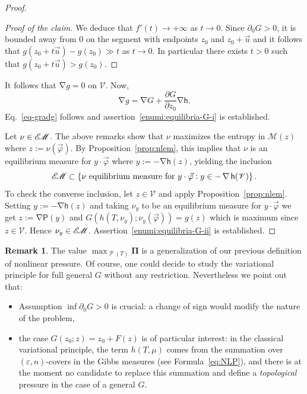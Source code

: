 \documentclass[10pt]{amsart}
\theoremstyle{definition}\newtheorem{defi}[theo]{Definition}\newtheorem{rema}[theo]{Remark}\newtheorem{exam}[theo]{Example}\newtheorem{exem}[theo]{Example}\newtheorem{nota}[theo]{Notation}
\theoremstyle{plain}
\theoremstyle{plain}
\newcommand\eps{\varepsilon}
\newcommand\FNLP{\boldsymbol{\Pi}}
\newcommand\vpot{\vec\pot}
\newcommand\Prob{{\operatorname{\mathscr{P}}}}
\newcommand{\grad}{\operatorname{\nabla}}
\newcommand{\hf}{\mathsf{h}}
\newcommand{\Pf}{\mathsf{P}}
\newcommand{\EM}{\mathscr{E\kern-2pt M}}
\newcommand{\pot}{\varphi}
\newcounter{In}
\newcommand*\8{\infty}
\newcommand{\cM}{\mathcal{M}}
\newcommand{\scV}{\mathscr{V}}
\begin{document}
\begin{proof}
\begin{proof}[Proof of the claim]
We deduce that $f'(t)\to+\infty$ as $t\to0$. Since $\partial_0G>0$, it is bounded away from $0$ on the segment with endpoints $z_0$ and $z_0+\vec u$ and it follows that $g(z_0+t \vec u)-g(z_0)\gg t$ as $t\to0$. In particular there exists $t>0$ such that $g(z_0+t \vec u)>g(z_0)$.
\end{proof}


It follows that $\grad g = 0$ on $\scV$. Now,
\begin{equation}\label{eq-grad-g}
\grad g = \grad G + \frac{\partial G}{\partial z_0} \grad \hf.
\end{equation}
Eq.~\eqref{eq-gradg} follows and assertion~\eqref{enumi:equilibria-G-i} is established.

Let $\nu\in\EM$. The above remarks show that $\nu$ maximizes the entropy in $\cM(z)$ where $ z:=\nu(\vpot)$. By Proposition~\ref{prop:nlem}, this implies that $\nu$ is an equilibrium measure for $y\cdot\vpot$ where $ y:=-\grad\hf(z)$, yielding the inclusion
\[
\EM \subset \left\{ \nu \text{ equilibrium measure for }y\cdot\vpot : y\in -\grad\hf(\scV)\right\}.
\]
To check the converse inclusion, let $ z\in\scV$ and apply Proposition~\ref{prop:nlem}. Setting $y:=-\grad\hf(z)$ and taking $\nu_y$ to be an equilibrium measure for $y\cdot\vpot$ we get $ z:=\grad\Pf(y)$ and $G(h(T,\nu_{ y});\nu_{ y}(\vpot))=g(z)$ which is maximum since $ z\in\scV$. Hence $\nu_{ y}\in\EM$. Assertion~\eqref{enumi:equilibria-G-ii} is established.
\end{proof}


\begin{rema}
The value $\max_{\Prob(T)} \FNLP$ is a generalization of our previous definition of nonlinear pressure. Of course, one could decide to study the variational principle for full general $G$ without any restriction. Nevertheless we point out that:
\begin{itemize}
\item[\eqref{enumi:equilibria-G-i}] Assumption $\inf\partial_0 G>0$ is crucial: a change of sign would modify the nature of the problem,
\item[\eqref{enumi:equilibria-G-ii}] the case $G(z_0; z) = z_0+F(z)$ is of particular interest: in the classical variational principle, the term $h(T,\mu)$ comes from the summation over $(\eps,n)$-covers in the Gibbs measures (see Formula~\eqref{eq:NLP}), and there is at the moment no candidate to replace this summation and define a \emph{topological} pressure in the case of a general $G$.
\end{itemize}
\end{rema}
\end{document}
